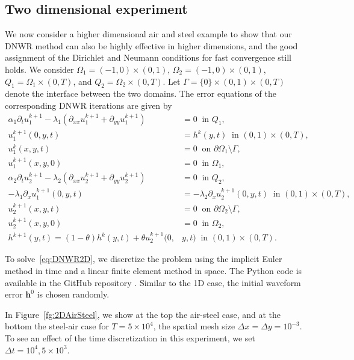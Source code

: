 \documentclass[reqno]{amsart}
\begin{document}
\subsection{Two dimensional experiment}
We now consider a higher dimensional air and steel example to show that our DNWR method can also be highly effective in higher dimensions, and the good assignment of the Dirichlet and Neumann conditions for fast convergence still holds.
We consider $\Omega_1 = (-1,0) \times (0,1)$, $\Omega_2 = (-1,0) \times (0,1)$, $Q_1 = \Omega_1 \times (0,T)$, and $Q_2 = \Omega_2 \times (0,T)$. 
Let $\Gamma = \{0\} \times (0,1) \times (0,T)$ denote the interface between the two domains. The error equations of the corresponding DNWR iterations are given by
\begin{equation}\label{eq:DNWR2D}
	\begin{aligned}
		\alpha_1 \partial_t u_1^{k+1} - \lambda_1 \left(\partial_{xx} u_1^{k+1} + \partial_{yy} u_1^{k+1} \right) &= 0 \ \text{ in } Q_1,\\
		u_1^{k+1}(0,y,t) &= h^{k}(y,t) \ \text{ in } (0, 1)\times(0, T),\\
		u_1^k(x,y,t) &= 0 \ \text{ on } \partial \Omega_1 \setminus \Gamma, \\
		u_1^{k+1}(x, y,  0) &= 0 \ \text{ in } \Omega_1,\\
		\alpha_2 \partial_t u_2^{k+1} - \lambda_2 \left(\partial_{xx} u_2^{k+1} + \partial_{yy} u_2^{k+1} \right) &= 0 \ \text{ in } Q_2, \\
		-\lambda_1 \partial_x u_1^{k+1}(0,y, t) &= -\lambda_2 \partial_x u_2^{k+1}(0,y, t) \ \text{ in } (0, 1)\times(0, T), \\
		u_2^{k+1}(x, y, t) &= 0 \ \text{ on } \partial \Omega_2 \setminus \Gamma,\\
		u_2^{k+1}(x, y, 0) &= 0 \ \text{ in } \Omega_2,\\
		h^{k+1}(y,t) = (1-\theta) h^k(y, t) + \theta u_2^{k+1}(0, &y, t) \ \text{ in } (0, 1)\times(0, T).
	\end{aligned}
\end{equation}


To solve~\eqref{eq:DNWR2D}, we discretize the problem using the implicit Euler method in time and a linear finite element method in space. The Python code is available in the GitHub repository \cite{Me25}. Similar to the 1D case, the initial waveform error $\boldsymbol h^0$ is chosen randomly. 

In Figure~\ref{fg:2DAirSteel}, we show at the top the air-steel case, and at the bottom the steel-air case for $T=5 \times 10^{4}$, the spatial mesh size $\Delta x = \Delta y = 10^{-3}$. To see an effect of the time discretization in this experiment, we set $\Delta t = 10^4, 5 \times 10^3$.
	
\end{document}
